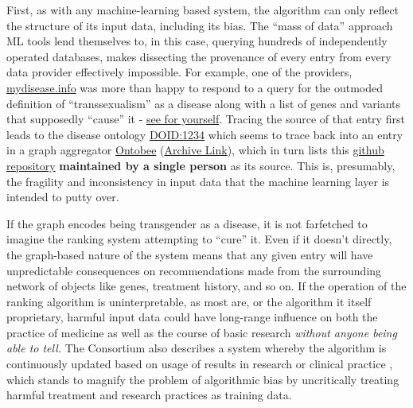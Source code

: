 First, as with any machine-learning based system, the algorithm can only
reflect the structure of its input data, including its bias. The ``mass
of data'' approach ML tools lend themselves to, in this case, querying
hundreds of independently operated databases, makes dissecting the
provenance of every entry from every data provider effectively
impossible. For example, one of the providers,
\href{https://mydisease.info}{mydisease.info} was more than happy to
respond to a query for the outmoded definition of ``transsexualism'' as
a disease \citep{ramTransphobiaEncodedExamination2021}  along with
a list of genes and variants that supposedly ``cause'' it -
\href{http://mydisease.info/v1/query?q=\%22DOID\%3A10919\%22}{see for
yourself}. Tracing the source of that entry first leads to the disease
ontology
\href{https://web.archive.org/web/20211007053446/https://www.ebi.ac.uk/ols/ontologies/doid/terms?iri=http\%3A\%2F\%2Fpurl.obolibrary.org\%2Fobo\%2FDOID_1234}{DOID:1234}
which seems to trace back into an entry in a graph aggregator
\href{http://www.ontobee.org/ontology/DOID?iri=http://purl.obolibrary.org/obo/DOID_1234}{Ontobee}
(\href{https://web.archive.org/web/20210923110103/http://www.ontobee.org/ontology/DOID?iri=http://purl.obolibrary.org/obo/DOID_1234}{Archive
Link}), which in turn lists this
\href{https://github.com/jannahastings/mental-functioning-ontology}{github
repository} \textbf{maintained by a single person} as its
source. This is, presumably, the fragility
and inconsistency in input data that the machine learning layer is
intended to putty over.

If the graph encodes being transgender as a disease, it is not
farfetched to imagine the ranking system attempting to ``cure'' it. Even
if it doesn't directly, the graph-based nature of the system means that
any given entry will have unpredictable consequences on recommendations
made from the surrounding network of objects like genes, treatment
history, and so on. If the operation of the ranking algorithm is
uninterpretable, as most are, or the algorithm it itself proprietary,
harmful input data could have long-range influence on both the practice
of medicine as well as the course of basic research \emph{without anyone
being able to tell.} The Consortium also describes a system whereby the
algorithm is continuously updated based on usage of results in research
or clinical practice \citep{consortiumUniversalBiomedicalData2019} , which stands to magnify the problem of algorithmic bias by
uncritically treating harmful treatment and research practices as
training data.

